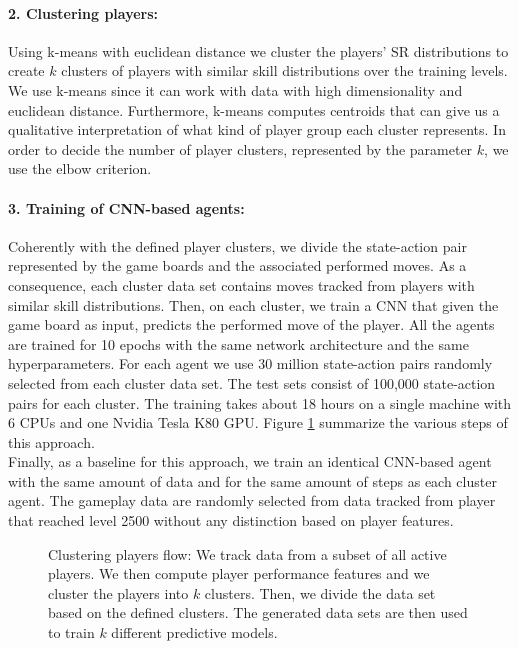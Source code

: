 \paragraph{2. Clustering players:}
Using k-means with euclidean distance we cluster the players' SR distributions to create $k$ clusters of players with similar skill distributions over the training levels. We use k-means since it can work with data with high dimensionality and euclidean distance. Furthermore, k-means computes centroids that can give us a qualitative interpretation of what kind of player group each cluster represents. In order to decide the number of player clusters, represented by the parameter $k$, we use the elbow criterion.

\paragraph{3. Training of \acs{CNN}-based agents:}
Coherently with the defined player clusters, we divide the state-action pair represented by the game boards and the associated performed moves. As a consequence, each cluster data set contains moves tracked from players with similar skill distributions. Then, on each cluster, we train a \acs{CNN} that given the game board as input, predicts the performed move of the player. All the agents are trained for 10 epochs with the same network architecture and the same hyperparameters. For each agent we use 30 million state-action pairs randomly selected from each cluster data set. The test sets consist of 100,000 state-action pairs for each cluster. The training takes about 18 hours on a single machine with 6 CPUs and one Nvidia Tesla K80 GPU. Figure \ref{fig:clustering_players_flow} summarize the various steps of this approach. \\

Finally, as a baseline for this approach, we train an identical \acs{CNN}-based agent with the same amount of data and for the same amount of steps as each cluster agent. The gameplay data are randomly selected from data tracked from player that reached level 2500 without any distinction based on player features. 

\begin{figure}[!ht]
    \centering 
    
    \caption{Clustering players flow: We track data from a subset of all active players. We then compute player performance features and we cluster the players into $k$ clusters. Then, we divide the data set based on the defined clusters. The generated data sets are then used to train $k$ different predictive models.}
    \label{fig:clustering_players_flow}
\end{figure}




